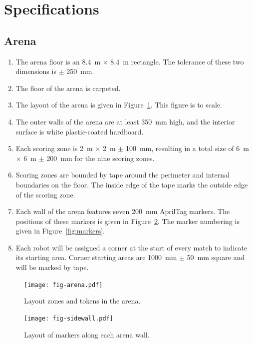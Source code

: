 \section{Specifications}
\label{sec:specs}

\subsection{Arena}
\label{spec:arena}

\begin{enumerate}
  \item The arena floor is an \SI{8.4}{m} $\times$ \SI{8.4}{m} rectangle. The
        tolerance of these two dimensions is $\pm$ \SI{250}{mm}.
  \item The floor of the arena is carpeted.
  \item The layout of the arena is given in Figure~\ref{fig:arena}. This
        figure is to scale.
  \item The outer walls of the arena are at least \SI{350}{mm} high, and the
        interior surface is white plastic-coated hardboard.
  \item Each scoring zone is \SI{2}{m} $\times$ \SI{2}{m} $\pm$ \SI{100}{mm},
        resulting in a total size of \SI{6}{m} $\times$ \SI{6}{m} $\pm$ \SI{200}{mm}
        for the nine scoring zones.
  \item Scoring zones are bounded by tape around the perimeter
        and internal boundaries on the floor. The inside edge of the tape marks the outside
        edge of the scoring zone.
  \item Each wall of the arena features seven \SI{200}{mm} AprilTag markers.
        The positions of these markers is given in Figure~\ref{fig:sidewall}.
        The marker numbering is given in Figure~\ref{fig:markers}.
  \item Each robot will be assigned a corner at the start of every match to indicate its starting area.
        Corner starting areas are \SI{1000}{mm} $\pm$ \SI{50}{mm} square and will be marked by tape.
\end{enumerate}

\begin{figure}
  \centering
  \texttt{[image: fig-arena.pdf]}
  \caption{Layout zones and tokens in the arena.}
  \label{fig:arena}
\end{figure}


\begin{figure}
  \centering
  \texttt{[image: fig-sidewall.pdf]}
  \caption{Layout of markers along each arena wall.}
  \label{fig:sidewall}
\end{figure}


